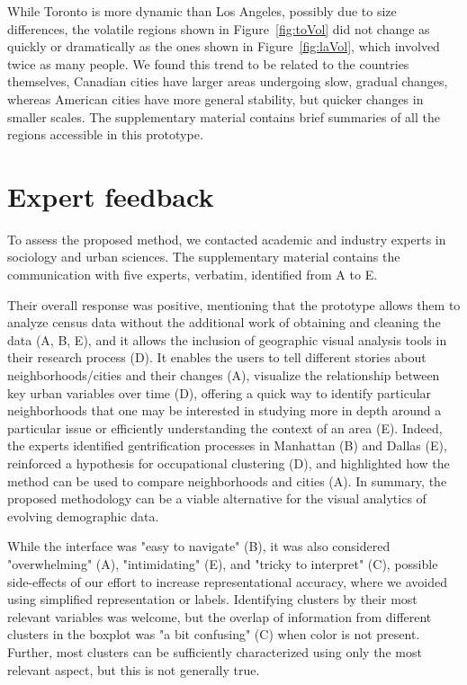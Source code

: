 \smallskip While Toronto is more dynamic than Los Angeles, possibly due to size
differences, the volatile regions shown in Figure~\ref{fig:toVol} did not change
as quickly or dramatically as the ones shown in Figure~\ref{fig:laVol}, which
involved twice as many people. We found this trend to be related to the
countries themselves, Canadian cities have larger areas undergoing slow, gradual
changes, whereas American cities have more general stability, but quicker
changes in smaller scales. The supplementary material contains brief summaries
of all the regions accessible in this prototype.




\section{Expert feedback}
To assess the proposed method, we contacted academic and industry experts in
sociology and urban sciences. The supplementary material contains the
communication with five experts, verbatim, identified from A to E. 


Their overall response was positive,  mentioning that the prototype allows them
to analyze census data without the additional work of obtaining and cleaning the
data (A, B, E), and it allows the inclusion of geographic visual analysis tools
in their research process (D). It enables the users to tell different stories
about neighborhoods/cities and their changes (A), visualize the relationship
between key urban variables over time (D), offering a quick way to identify
particular neighborhoods that one may be interested in studying more in depth
around a particular issue or efficiently understanding the context of an area
(E).  Indeed, the experts identified gentrification processes in Manhattan (B)
and Dallas (E), reinforced a hypothesis for occupational clustering (D), and
highlighted how the method can be used to compare neighborhoods and cities (A).
In summary, the proposed methodology can be a viable alternative for the visual
analytics of evolving demographic data.



While the interface was "easy to navigate" (B), it was also considered
"overwhelming" (A), "intimidating" (E), and "tricky to interpret" (C), possible
side-effects of our effort to increase  representational accuracy, where we
avoided using simplified representation or labels. Identifying clusters by their
most relevant variables was welcome, but the overlap of information from
different clusters in the boxplot was "a bit confusing" (C) when color is not
present. Further, most clusters can be sufficiently characterized using only the
most relevant aspect, but this is not generally true. 


